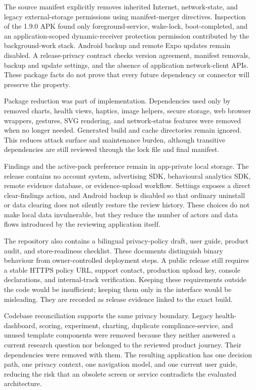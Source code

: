 The source manifest explicitly removes inherited Internet, network-state, and legacy external-storage permissions using manifest-merger directives. Inspection of the 1.9.0 APK found only foreground-service, wake-lock, boot-completed, and an application-scoped dynamic-receiver protection permission contributed by the background-work stack. Android backup and remote Expo updates remain disabled. A release-privacy contract checks version agreement, manifest removals, backup and update settings, and the absence of application network-client APIs. These package facts do not prove that every future dependency or connector will preserve the property.

Package reduction was part of implementation. Dependencies used only by removed charts, health views, haptics, image helpers, secure storage, web browser wrappers, gestures, SVG rendering, and network-status features were removed when no longer needed. Generated build and cache directories remain ignored. This reduces attack surface and maintenance burden, although transitive dependencies are still reviewed through the lock file and final manifest.

Findings and the active-pack preference remain in app-private local storage. The release contains no account system, advertising SDK, behavioural analytics SDK, remote evidence database, or evidence-upload workflow. Settings exposes a direct clear-findings action, and Android backup is disabled so that ordinary uninstall or data clearing does not silently restore the review history. These choices do not make local data invulnerable, but they reduce the number of actors and data flows introduced by the reviewing application itself.

The repository also contains a bilingual privacy-policy draft, user guide, product audit, and store-readiness checklist. These documents distinguish binary behaviour from owner-controlled deployment steps. A public release still requires a stable HTTPS policy URL, support contact, production upload key, console declarations, and internal-track verification. Keeping these requirements outside the code would be insufficient; keeping them only in the interface would be misleading. They are recorded as release evidence linked to the exact build.

Codebase reconciliation supports the same privacy boundary. Legacy health-dashboard, scoring, experiment, charting, duplicate compliance-service, and unused template components were removed because they neither answered a current research question nor belonged to the reviewed product journey. Their dependencies were removed with them. The resulting application has one decision path, one privacy context, one navigation model, and one current user guide, reducing the risk that an obsolete screen or service contradicts the evaluated architecture.

